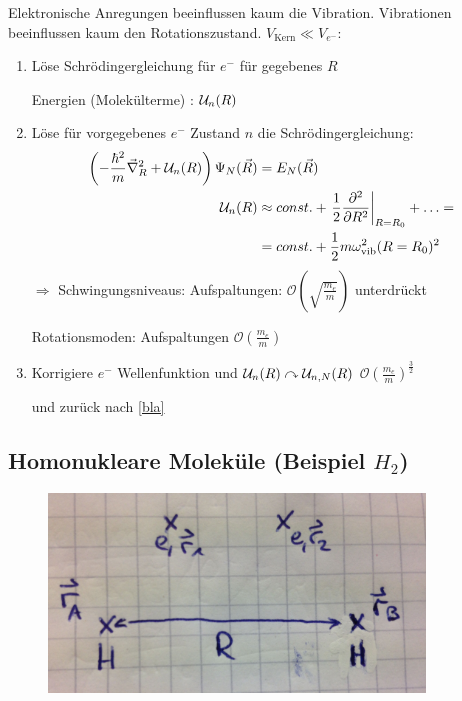 	Elektronische Anregungen beeinflussen kaum die Vibration. Vibrationen beeinflussen kaum den Rotationszustand. 
	$V_{\mathrm{Kern}} \ll V_{e^-}$:
	\begin{enumerate}[1.]
		\item Löse Schrödingergleichung für $e^-$ für gegebenes $R$
		
			Energien (Molekülterme) : $\mathcal{U}_n(R)$
		\item Löse für vorgegebenes $e^-$ Zustand $n$ die Schrödingergleichung: \label{bla}
				\begin{align*}
					\left( - \frac{\hbar^2}{m} \vec{\nabla}_R^2 + \mathcal{U}_n (R)
					\right)	
					\Psi_N (\vec{R}) &= E_N (\vec{R}) \\
					\mathcal{U}_n (R) &\approx const. + \left.\frac{1}{2} \frac{\partial^2}{\partial R^2}
					\right|_{R=R_0} + \ldots = \\
					&= const. + \frac{1}{2} m \omega_{\mathrm{vib}}^2 (R=R_0)^2 
				\end{align*}
			$\Rightarrow$ Schwingungsniveaus: Aufspaltungen: $\mathscr{O} \left(\sqrt{\frac{m_e}{m}}\right)$ unterdrückt
			
			Rotationsmoden: Aufspaltungen $\mathscr{O} \left(\frac{m_e}{m}\right)$
			
		\item Korrigiere $e^-$ Wellenfunktion und $\mathcal{U}_n(R) \curvearrowright \mathcal{U}_{n,N}(R)$ 
			 $\mathscr{O} \left(\frac{m_e}{m}\right)^{\frac{3}{2}}$ 
			 
			 und zurück nach \ref{bla}
	\end{enumerate}
\subsection{Homonukleare Moleküle (Beispiel $H_2$)}
	\begin{figure} [h]
		\begin{center}
			\includegraphics[width=10cm]{Born-Oppenh_Approx3}
		\end{center}
	\end{figure}